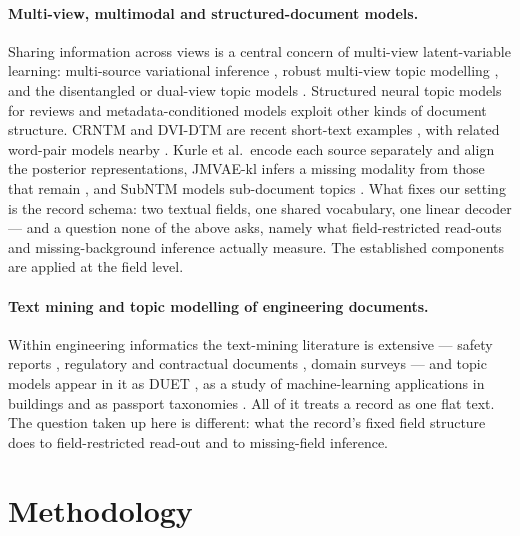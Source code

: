 \documentclass[pdflatex,sn-basic]{sn-jnl}
\begin{document}
\paragraph{Multi-view, multimodal and structured-document models.}
Sharing information across views is a central concern of multi-view latent-variable learning:
multi-source variational inference \cite{kurle2019multisource}, robust multi-view topic modelling
\cite{zhang2017robust}, and the disentangled or dual-view topic models
\cite{pergola2021disentangled,liu2022dualview}. Structured neural topic models for reviews
\cite{esmaeili2019structured} and metadata-conditioned models \cite{card2018metadata,roberts2019stm}
exploit other kinds of document structure. CRNTM and DVI-DTM are recent short-text examples
\cite{crntm2020,dvidtm2026}, with related word-pair models nearby
\cite{relationalbtm2018,sparsebtm2021}. Kurle et al.\ encode each source separately and align the
posterior representations, JMVAE-kl infers a missing modality from those that remain
\cite{suzuki2017jmvae}, and SubNTM models sub-document topics \cite{nguyen2026subntm}. What fixes
our setting is the record schema: two textual fields, one shared vocabulary, one linear decoder
--- and a question none of the above asks, namely what field-restricted read-outs and
missing-background inference actually measure. The established components are applied at the field level.

\paragraph{Text mining and topic modelling of engineering documents.}
Within engineering informatics the text-mining literature is extensive --- safety reports
\cite{civilsafety2015,civilaccident2018}, regulatory and contractual documents
\cite{compliance2013,ontology2015,contract2022,risknlp2023}, domain surveys
\cite{civilnlp2021,civilnlp2023} --- and topic models appear in it as DUET \cite{duet2019}, as a
study of machine-learning applications in buildings \cite{civiltopic2024} and as passport
taxonomies \cite{passport2026}. All of it treats a record as one flat text. The question taken up
here is different: what the record's fixed field structure does to field-restricted read-out and
to missing-field inference.

\section{Methodology}
\label{sec:method}
\end{document}
